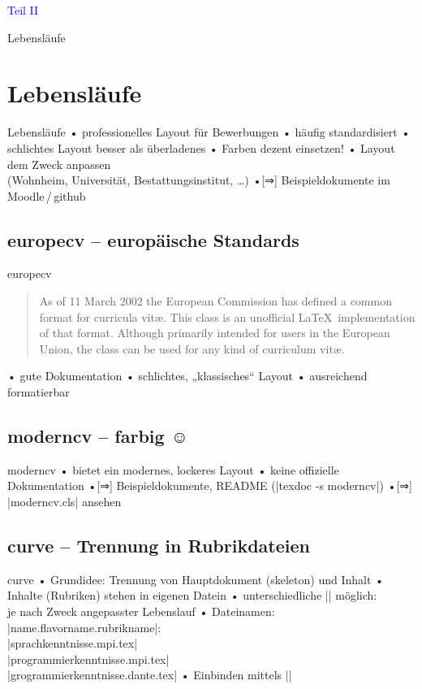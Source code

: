 \begin{frame}[c]
\centerline{\large \textcolor{blue}{Teil II}}
\centerline{Lebensläufe}
\end{frame}

\section{Lebensläufe}
\begin{frame}{Lebensläufe}
• professionelles Layout für Bewerbungen
• häufig standardisiert
• schlichtes Layout besser als überladenes
• Farben dezent einsetzen!
• Layout dem Zweck anpassen\\%
(Wohnheim, Universität, Bestattungsinstitut, \dots)
•[⇒] Beispieldokumente im Moodle\,/\,github
\•
\end{frame}

\subsection[europecv]{europecv – europäische Standards}
\begin{frame}[fragile]{europecv}
\begin{quotation}
As of 11 March 2002 the European Commission has defined a common format for curricula vitæ. This
class is an unofficial \LaTeX\ implementation of that format. Although primarily intended for users in the
European Union, the class can be used for any kind of curriculum vitæ.
\end{quotation}
• gute Dokumentation
• schlichtes, „klassisches“ Layout
• ausreichend formatierbar
\•
\end{frame}

\subsection{moderncv – farbig ☺}
\begin{frame}[fragile]{moderncv}
• bietet ein modernes, lockeres Layout
• \alert{keine} offizielle Dokumentation
•[⇒] Beispieldokumente, README (|texdoc -s moderncv|)
•[⇒] |moderncv.cls| ansehen
\•
\end{frame}

\subsection{curve – Trennung in Rubrikdateien}
\begin{frame}[fragile]{curve}
• Grundidee: Trennung von Hauptdokument (skeleton) und Inhalt
• Inhalte (Rubriken) stehen in eigenen Datein
• unterschiedliche |\flavor| möglich: \\%
je nach Zweck angepasster Lebenslauf
• Dateinamen: |name.flavorname.rubrikname|:\\%
|sprachkenntnisse.mpi.tex|\\%
|programmierkenntnisse.mpi.tex|\\%
|grogrammierkenntnisse.dante.tex|
• Einbinden mittels ||
\•
\end{frame}

